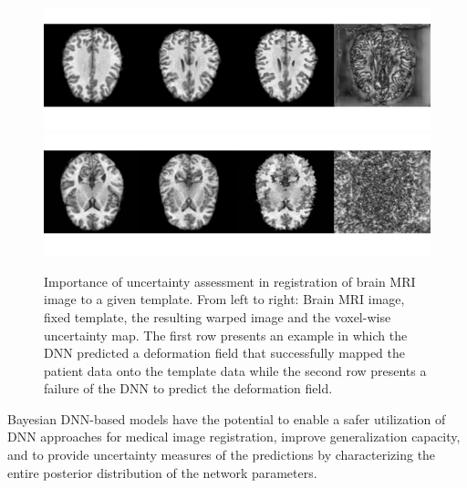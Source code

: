 \documentclass[preprint,authoryear]{elsarticle}
\begin{document}
\begin{figure}[t!]
    \centering
    \includegraphics[height=0.2\linewidth]{Intro_H2179693.png} \\
    \includegraphics[height=0.2\linewidth]{Intro_H26906164.png}
    \caption{Importance of uncertainty assessment in registration of brain MRI image to a given template. From left to right: Brain MRI image, fixed template, the resulting warped image and the voxel-wise uncertainty map. The first row presents an example in which the DNN predicted a deformation field that successfully mapped the patient data onto the template data while the second row presents a failure of the DNN to predict the deformation field. } %
    \label{fig:introexample}
\end{figure}

Bayesian DNN-based models have the potential to enable a safer utilization of DNN approaches for medical image registration, improve generalization capacity, and to provide uncertainty measures of the predictions by characterizing the entire posterior distribution of the network parameters.
\end{document}
